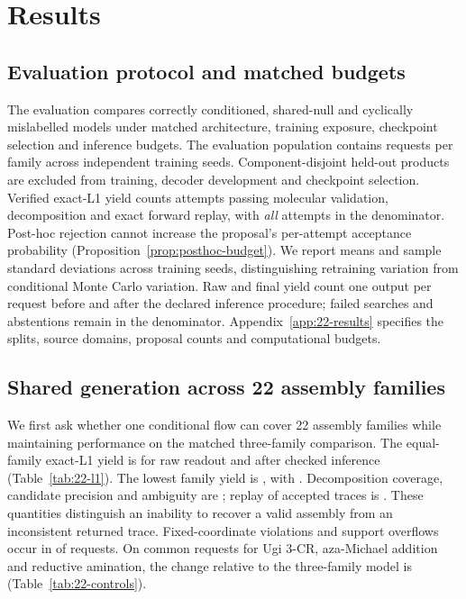\section{Results}
\label{sec:results}

\subsection{Evaluation protocol and matched budgets}
The evaluation compares correctly conditioned, shared-null and cyclically mislabelled models under
matched architecture, training exposure, checkpoint selection and inference budgets. The evaluation
population contains  requests per family across
 independent training seeds. Component-disjoint held-out
products are excluded from training, decoder development and checkpoint selection. Verified exact-L1
yield counts attempts passing molecular validation, decomposition and exact forward replay, with
\emph{all} attempts in the denominator. Post-hoc rejection cannot increase the proposal's per-attempt
acceptance probability (Proposition~\ref{prop:posthoc-budget}). We report means and sample standard
deviations across training seeds, distinguishing retraining variation from conditional Monte Carlo
variation. Raw and final yield count one output per request before and after the declared inference
procedure; failed searches and abstentions remain in the denominator. Appendix~\ref{app:22-results}
specifies the splits, source domains, proposal counts and computational budgets.

\subsection{Shared generation across 22 assembly families}
We first ask whether one conditional flow can cover 22 assembly families while maintaining
performance on the matched three-family comparison. The equal-family exact-L1 yield is
 for raw readout and  after checked inference
(Table~\ref{tab:22-l1}). The lowest family yield is , with
. Decomposition coverage, candidate precision and ambiguity
are ; replay of accepted traces is
. These quantities distinguish an inability to recover a valid
assembly from an inconsistent returned trace. Fixed-coordinate violations and support overflows
occur in  of  requests.
On common requests for Ugi 3-CR, aza-Michael addition and reductive amination, the change relative to
the three-family model is 
(Table~\ref{tab:22-controls}).

